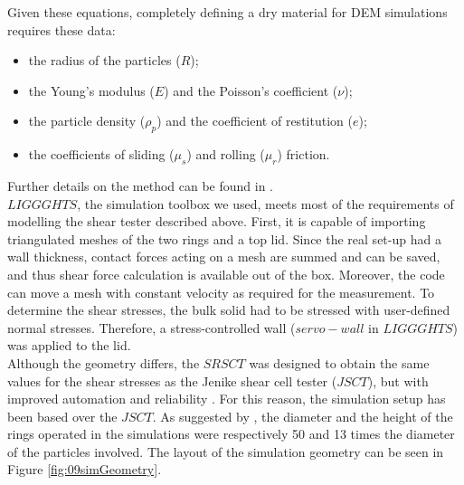 Given these equations, completely defining a dry material for DEM simulations requires these data:
\begin{itemize}
\item{the radius of the particles ($R$);}
\item{the Young's modulus ($E$) and the Poisson's coefficient ($\nu$);}
\item{the particle density ($\rho_p$) and the coefficient of restitution ($e$);}
\item{the coefficients of sliding ($\mu_s$) and rolling ($\mu_r$) friction.}
\end{itemize}


Further details on the method can be found in \cite{RefWorks:133}.\\


$LIGGGHTS$, the simulation toolbox we used, meets most of the requirements of modelling the shear tester described above. 
First, it is capable of importing triangulated meshes of the two rings and a top lid. Since the real set-up had a wall thickness, 
contact forces acting on a mesh are summed and can be saved, and thus shear force calculation is available out of the box. Moreover, 
the code can move a mesh with constant velocity as required for the measurement. 
To determine the shear stresses, the bulk solid had to be stressed with user-defined normal stresses.
Therefore, a stress-controlled wall ($servo-wall$ in $LIGGGHTS$) was applied to the lid. \\

Although the geometry differs, the $SRSCT$ was designed to obtain the same
values for the shear stresses as the Jenike shear cell tester ($JSCT$), but with
improved automation and reliability \cite{RefWorks:118}.
For this reason, the simulation setup has been based over the $JSCT$.
As suggested by \cite{RefWorks:139}, the diameter and the height of the rings operated in the simulations were respectively 50 and 13 times the diameter of the particles involved.
The layout of the simulation geometry can be seen in Figure \ref{fig:09simGeometry}. \\
 

